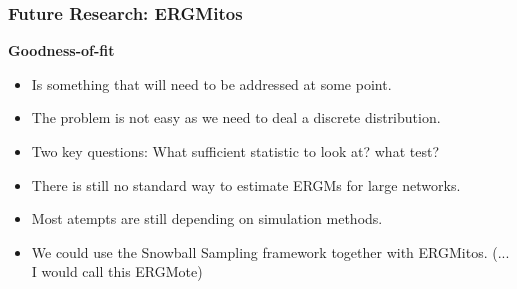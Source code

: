 \documentclass[aspectratio=169, 9pt]{beamer}\usepackage[]{graphicx}\usepackage[]{color}
\begin{document}
\begin{frame}[t]
\frametitle{Future Research: ERGMitos}

{\bf Goodness-of-fit}\pause
\begin{itemize}
\item Is something that will need to be addressed at some point.\pause
\item The problem is not easy as we need to deal a discrete distribution.\pause
\item Two key questions: What sufficient statistic to look at? what test?
\end{itemize}

 \pause
\begin{itemize}
\item There is still no standard way to estimate ERGMs for large networks.\pause
\item Most atempts are still depending on simulation methods.\pause
\item We could use the Snowball Sampling framework together with ERGMitos.\pause{}
(... I would call this ERGMote)
\end{itemize}

\end{frame}
\end{document}
